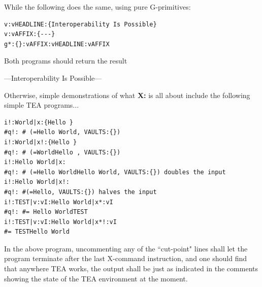 \documentclass[a4paper, 18pt]{book} %
\begin{document}
{{{\vspace{1em}

While the following does the same, using pure G-primitives:


\vspace{2em}

  \begin{tcolorbox}[teaterminalstyle, title=X: EXAMPLE 2: Transforming Text into Special Formats using G:, breakable]
  \begin{lstlisting}[language=TEA,breaklines=true,]
v:vHEADLINE:{Interoperability Is Possible} 
v:vAFFIX:{---} 
g*:{}:vAFFIX:vHEADLINE:vAFFIX
   \end{lstlisting}
  \end{tcolorbox}

\vspace{1em}

Both programs should return the result 


\vspace{2em}
 \begin{tcbverbatim}[title=Sample OUTPUT 1 from EXAMPLE 1 and EXAMPLE 2]
---Interoperability Is Possible---
  \end{tcbverbatim}
 \vspace{2em} 
 
 
 Otherwise, simple demonstrations of what \textbf{X:} is all about include the following simple TEA programs...
 
 
 \vspace{2em}

  \begin{tcolorbox}[teaterminalstyle, title=X: EXAMPLE 3: Several Mini-Programs Demonstrating Capabilities of X, breakable]
  \begin{lstlisting}[language=TEA,breaklines=true,]
i!:World|x:{Hello } 
#q!: # (=Hello World, VAULTS:{})
i!:World|x!:{Hello } 
#q!: # (=WorldHello , VAULTS:{})
i!:Hello World|x: 
#q!: # (=Hello WorldHello World, VAULTS:{}) doubles the input
i!:Hello World|x!: 
#q!: #(=Hello, VAULTS:{}) halves the input
i!:TEST|v:vI:Hello World|x*:vI 
#q!: #= Hello WorldTEST
i!:TEST|v:vI:Hello World|x*!:vI 
#= TESTHello World
   \end{lstlisting}
  \end{tcolorbox}

\vspace{1em}

In the above program, uncommenting any of the ``cut-point" lines shall let the program terminate after the last X-command instruction, and one should find that anywhere TEA works, the output shall be just as indicated in the comments showing the state of the TEA environment at the moment.



}}}
\end{document}

